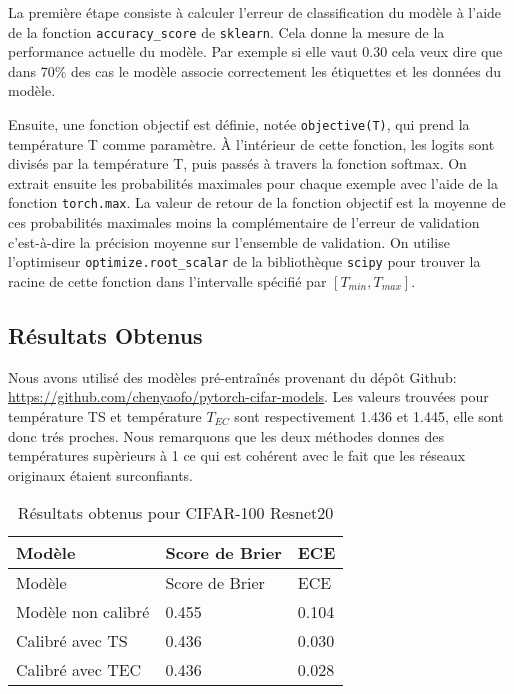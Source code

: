 \documentclass[
  letterpaper,
  DIV=11,
  numbers=noendperiod]{scrartcl}
\begin{document}
La première étape consiste à calculer l'erreur de classification du
modèle à l'aide de la fonction \texttt{accuracy\_score} de
\texttt{sklearn}. Cela donne la mesure de la performance actuelle du
modèle. Par exemple si elle vaut 0.30 cela veux dire que dans 70\% des
cas le modèle associe correctement les étiquettes et les données du
modèle.

Ensuite, une fonction objectif est définie, notée \texttt{objective(T)},
qui prend la température T comme paramètre. À l'intérieur de cette
fonction, les logits sont divisés par la température T, puis passés à
travers la fonction softmax. On extrait ensuite les probabilités
maximales pour chaque exemple avec l'aide de la fonction
\texttt{torch.max}. La valeur de retour de la fonction objectif est la
moyenne de ces probabilités maximales moins la complémentaire de
l'erreur de validation c'est-à-dire la précision moyenne sur l'ensemble
de validation. On utilise l'optimiseur \texttt{optimize.root\_scalar} de
la bibliothèque \texttt{scipy} pour trouver la racine de cette fonction
dans l'intervalle spécifié par \([T_{min}, T_{max}]\).

\hypertarget{ruxe9sultats-obtenus}{%
\subsection{Résultats Obtenus}\label{ruxe9sultats-obtenus}}

Nous avons utilisé des modèles pré-entraînés provenant du dépôt Github:
\url{https://github.com/chenyaofo/pytorch-cifar-models}. Les valeurs
trouvées pour température TS et température \(T_{EC}\) sont
respectivement 1.436 et 1.445, elle sont donc trés proches. Nous
remarquons que les deux méthodes donnes des températures supèrieurs à 1
ce qui est cohérent avec le fait que les réseaux originaux étaient
surconfiants.

\hypertarget{tbl-first}{}
\begin{longtable}[]{@{}lll@{}}
\caption{\label{tbl-first}Résultats obtenus pour CIFAR-100
Resnet20}\tabularnewline
\toprule\noalign{}
Modèle & Score de Brier & ECE \\
\midrule\noalign{}
\endfirsthead
\toprule\noalign{}
Modèle & Score de Brier & ECE \\
\midrule\noalign{}
\endhead
\bottomrule\noalign{}
\endlastfoot
Modèle non calibré & 0.455 & 0.104 \\
Calibré avec TS & 0.436 & 0.030 \\
Calibré avec TEC & 0.436 & 0.028 \\
\end{longtable}
\end{document}
